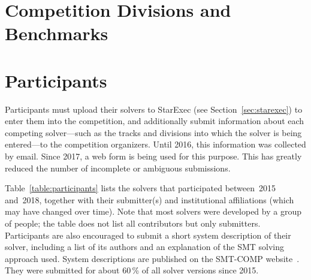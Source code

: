\documentclass[twoside,11pt]{article}
\begin{document}

\section{Competition Divisions and Benchmarks}
\label{sec:benchmarks}


\section{Participants}
\label{sec:participants}

Participants must upload their solvers to StarExec (see
Section~\ref{sec:starexec}) to enter them into the competition, and
additionally submit information about each competing solver---such as
the tracks and divisions into which the solver is being entered---to
the competition organizers.  Until 2016, this information was
collected by email.  Since 2017, a web form is being used for this
purpose.  This has greatly reduced the number of incomplete or
ambiguous submissions.

Table~\ref{table:participants} lists the solvers that participated
between~2015 and~2018, together with their submitter(s) and
institutional affiliations (which may have changed over time).  Note
that most solvers were developed by a group of people; the table does
not list all contributors but only submitters.
%
Participants are also encouraged to submit a short system description
of their solver, including a list of its authors and an explanation of
the SMT solving approach used.  System descriptions are published on
the SMT-COMP website~\cite{smtcomp-web}.  They were submitted for
about 60\,\% of all solver versions since 2015.
\end{document}
